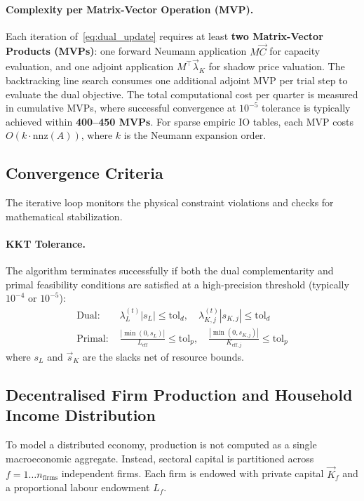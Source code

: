 \paragraph{Complexity per Matrix-Vector Operation (MVP).}
Each iteration of~\eqref{eq:dual_update} requires at least \textbf{two Matrix-Vector Products (MVPs)}: one forward Neumann application $M\vec{C}$ for capacity evaluation, and one adjoint application $M^\top\vec{\lambda}_K$ for shadow price valuation. The backtracking line search consumes one additional adjoint MVP per trial step to evaluate the dual objective. 
The total computational cost per quarter is measured in cumulative MVPs, where successful convergence at $10^{-5}$ tolerance is typically achieved within \textbf{400--450 MVPs}.
For sparse empiric IO tables, each MVP costs $O(k \cdot \mathrm{nnz}(A))$, where $k$ is the Neumann expansion order.
\subsection{Convergence Criteria}

The iterative loop monitors the physical constraint violations and checks for mathematical stabilization.

\paragraph{KKT Tolerance.}
The algorithm terminates successfully if both the dual complementarity and primal feasibility conditions are satisfied at a high-precision threshold (typically $10^{-4}$ or $10^{-5}$):
\begin{align}
  \text{Dual: } & \lambda_{L}^{(t)} |s_L| \leq \text{tol}_d, \quad \lambda_{K,j}^{(t)}|s_{K,j}| \leq \text{tol}_d \\
  \text{Primal: } & \frac{| \min(0, s_L) |}{L_{\text{eff}}} \leq \text{tol}_p, \quad \frac{| \min(0, s_{K,j}) |}{K_{\text{eff},j}} \leq \text{tol}_p
\end{align}
where $s_L$ and $\vec{s}_K$ are the slacks net of resource bounds. 

\subsection{Decentralised Firm Production and Household Income Distribution}

To model a distributed economy, production is not computed as a single macroeconomic aggregate. Instead, sectoral capital is partitioned across $f = 1 \dots n_{\text{firms}}$ independent firms. Each firm is endowed with private capital $\vec{K}_f$ and a proportional labour endowment $L_f$.


